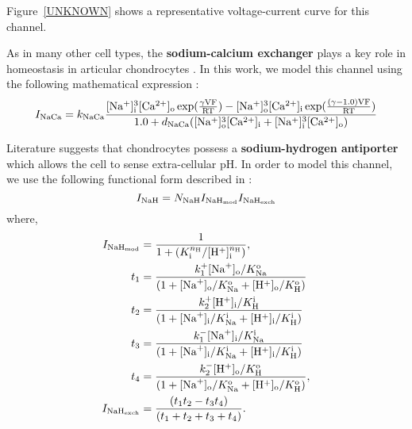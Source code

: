 Figure~\ref{UNKNOWN} shows a representative voltage-current curve for
this channel.

As in many other cell types, the {\bf sodium-calcium exchanger} plays
a key role in \Ca homeostasis in articular chondrocytes
\citep{Sanchezetal2006}. In this work, we model this channel using the
following mathematical expression \citep{Nygrenetal1998}:
\begin{equation}
  I_{\rm NaCa} = k_{\rm NaCa} \frac{[\rm Na^{+}]^{3}_{i}[\rm
    Ca^{2+}]_{o} \exp(\frac{\gamma V F}{R T}) - [\rm
    Na^{+}]^{3}_{o}[\rm Ca^{2+}]_{i} \exp(\frac{(\gamma - 1.0) V F}{R
      T})} {1.0 + d_{\rm NaCa}([\rm Na^{+}]^{3}_{o}[\rm Ca^{2+}]_{i} +
    [\rm Na^{+}]^{3}_{i}[\rm Ca^{2+}]_{o})}
\end{equation}


Literature suggests that chondrocytes possess a {\bf sodium-hydrogen
  antiporter} \citep{Halletal1996,Wilkinsetal2000} which allows the
cell to sense extra-cellular pH. In order to model this channel, we
use the following functional form described in \citet{Chaetal2009}:
\begin{equation}
    I_{\rm NaH} = N_{\rm NaH} I_{\rm NaH_{\rm mod}}
    I_{\rm NaH_{\rm exch}}
\end{equation}
where,
\begin{equation}
  \begin{split}
    I_{{\rm NaH}_{\rm mod}} & = \frac{1}{1 + (K_{\rm i}^{n_{\rm
          H}}/[{\rm H}^{+}]_{\rm i}^{n_{\rm H}})},\\
    t_{1} & = \frac{k_{1}^{+} [{\rm Na}^{+}]_{\rm o}/K_{\rm Na}^{\rm
        o}} {(1 + [{\rm Na}^{+}]_{\rm o}/K_{\rm Na}^{\rm o} + [{\rm
        H}^{+}]_{\rm o} /K_{\rm H}^{\rm o})}\\
    t_{2} & = \frac{k_{2}^{+} [{\rm H}^{+}]_{\rm i}/K_{\rm H}^{\rm i}}
    {(1 + [{\rm Na}^{+}]_{\rm i}/K_{\rm Na}^{\rm i} + [{\rm
        H}^{+}]_{\rm i}/K_{\rm H}^{\rm i})}\\
    t_{3} & = \frac{k_{1}^{-} [{\rm Na}^{+}]_{\rm i}/K_{\rm Na}^{\rm
        i}} {(1 + [{\rm Na}^{+}]_{\rm i}/K_{\rm Na}^{\rm i} + [{\rm
        H}^{+}]_{\rm i} /K_{\rm H}^{\rm i})}\\
    t_{4} & = \frac{k_{2}^{-} [{\rm H}^{+}]_{\rm o}/K_{\rm H}^{\rm
        o}} {(1 + [{\rm Na}^{+}]_{\rm o}/K_{\rm Na}^{\rm o} + [{\rm
        H}^{+}]_{\rm o} /K_{\rm H}^{\rm o})},\\
    I_{{\rm NaH}_{\rm exch}} & = \frac{(t_1 t_2 - t_3 t_4)}
    {(t_1 + t_2 + t_3 + t_4)}.\\
  \end{split}
\end{equation}

